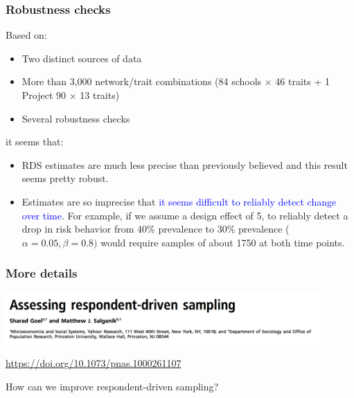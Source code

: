 \documentclass[aspectratio=169]{beamer}
\begin{document}
\begin{frame}
\frametitle{Robustness checks}

Based on:
\begin{itemize}
\item Two distinct sources of data
\item More than 3,000 network/trait combinations (84 schools $\times$ 46 traits + 1 Project 90 $\times$ 13 traits) %
\item Several robustness checks
\end{itemize}

it seems that:
\begin{itemize}
\item RDS estimates are much less precise than previously believed and this result seems pretty robust. \pause
\item Estimates are so imprecise that \textcolor{blue}{it seems difficult to reliably detect change over time}.  For example, if we assume a design effect of 5, to reliably detect a drop in risk behavior from 40\% prevalence to 30\% prevalence ($\alpha=0.05, \beta=0.8)$ would require samples of about 1750 at both time points. \pauses
\end{itemize}

\end{frame}
\begin{frame}
\frametitle{More details}

\begin{center}
  \includegraphics[width=0.9\textwidth]{figures/goel_assessing_2010_title}
\end{center}

\vfill
\url{https://doi.org/10.1073/pnas.1000261107}

\end{frame}
\begin{frame}

How can we improve respondent-driven sampling?

\end{frame}
\end{document}

